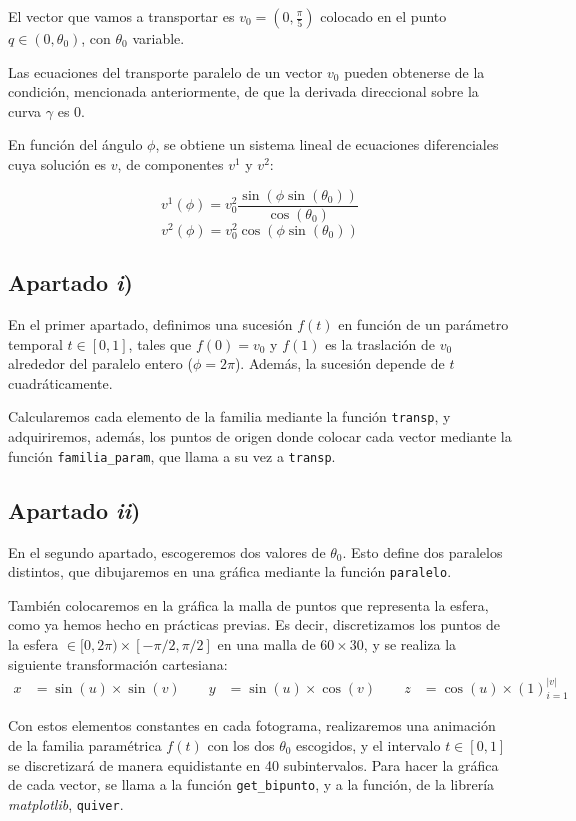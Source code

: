 \documentclass[a4paper]{article}
\begin{document}
	El vector que vamos a transportar es $v_0=(0,\frac{\pi}{5})$ colocado en el punto $q\in(0,\theta_0)$, con $\theta_0$ variable.
	
	Las ecuaciones del transporte paralelo de un vector $v_0$ pueden obtenerse de la condición, mencionada anteriormente, de que la derivada direccional sobre la curva $\gamma$ es 0. 
	
	En función del ángulo $\phi$, se obtiene un sistema lineal de ecuaciones diferenciales cuya solución es $v$, de componentes $v^1$ y $v^2$:
	
	\[ v^1(\phi) = v_0^2 \frac{\sin(\phi\sin(\theta_0))}{\cos(\theta_0)} \]
	\[ v^2(\phi) = v_0^2 \cos(\phi\sin(\theta_0)) \]
	
	
	\subsection{Apartado \textit{i})}
	En el primer apartado, definimos una sucesión $f(t)$ en función de un parámetro temporal $t\in[0,1]$, tales que $f(0)=v_0$ y $f(1)$ es la traslación de $v_0$ alrededor del paralelo entero ($\phi= 2\pi$). Además, la sucesión depende de $t$ cuadráticamente.
	
	Calcularemos cada elemento de la familia mediante la función \texttt{transp}, y adquiriremos, además, los puntos de origen donde colocar cada vector mediante la función \texttt{familia\_param}, que llama a su vez a \texttt{transp}.
	
	\subsection{Apartado \textit{ii})}
	En el segundo apartado, escogeremos dos valores de $\theta_0$. Esto define dos paralelos distintos, que dibujaremos en una gráfica mediante la función \texttt{paralelo}. 
	
	También colocaremos en la gráfica la malla de puntos que representa la esfera, como ya hemos hecho en prácticas previas. Es decir, discretizamos los puntos de la esfera $\in [0,2\pi)\times [-\pi/2, \pi/2]$ en una malla de $60\times30$, y se realiza la siguiente transformación cartesiana:
	\[
	\begin{aligned}
	x &= \sin(u) \times \sin(v)\qquad
	y &= \sin(u) \times \cos(v)\qquad
	z &= \cos(u) \times (1)_{i=1}^{|v|}
	\end{aligned}
	\]
	
	Con estos elementos constantes en cada fotograma, realizaremos una animación de la familia paramétrica $f(t)$ con los dos $\theta_0$ escogidos, y el intervalo $t\in[0,1]$ se discretizará de manera equidistante en 40 subintervalos. Para hacer la gráfica de cada vector, se llama a la función \texttt{get\_bipunto}, y a la función, de la librería \textit{matplotlib}, \texttt{quiver}.
	
\end{document}
